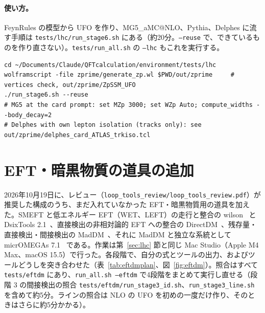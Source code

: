 \documentclass[a4paper,10pt]{ltjsarticle}
\makeatletter
\newcommand{\MGaMC}{MG5\_aMC@NLO}
\makeatother
\begin{document}
\paragraph{使い方。}FeynRules の模型から UFO を作り、\MGaMC{}、Pythia、Delphes に流す手順は \nolinkurl{tests/lhc/run_stage6.sh} にある（約20分。\texttt{--reuse} で、できているものを作り直さない）。\texttt{tests/run\_all.sh} の \texttt{--lhc} もこれを実行する。
\begin{Verbatim}
cd ~/Documents/Claude/QFTcalculation/environment/tests/lhc
wolframscript -file zprime/generate_zp.wl $PWD/out/zprime     # vertices check, out/zprime/ZpSSM_UFO
./run_stage6.sh --reuse
# MG5 at the card prompt: set MZp 3000; set WZp Auto; compute_widths --body_decay=2
# Delphes with own lepton isolation (tracks only): see out/zprime/delphes_card_ATLAS_trkiso.tcl
\end{Verbatim}

\section{EFT・暗黒物質の道具の追加}\label{sec:eftdm}

2026年10月19日に、レビュー（\nolinkurl{loop_tools_review/loop_tools_review.pdf}）が推奨した構成のうち、まだ入れていなかった EFT・暗黒物質用の道具を加えた。SMEFT と低エネルギー EFT（WET、LEFT）の走行と整合の wilson~\cite{wilson} と DsixTools 2.1~\cite{dsixtools,dsixtools2}、直接検出の非相対論的 EFT への整合の DirectDM~\cite{directdm}、残存量・直接検出・間接検出の MadDM~\cite{maddm3,maddm32}、それに MadDM と独立な系統として micrOMEGAs 7.1~\cite{micromegas6} である。作業は第~\ref{sec:lhc} 節と同じ Mac Studio（Apple M4 Max、macOS 15.5）で行った。各段階で、自分の式とツールの出力、およびツールどうしを突き合わせた（表~\ref{tab:eftdmplan}、図~\ref{fig:eftdm}）。照合はすべて \nolinkurl{tests/eftdm} にあり、\texttt{run\_all.sh --eftdm} で4段階をまとめて実行し直せる（段階 3 の間接検出の照合 \nolinkurl{tests/eftdm/run_stage3_id.sh}、\texttt{run\_stage3\_line.sh} を含めて約5分。ラインの照合は NLO の UFO を初めの一度だけ作り、そのときはさらに約5分かかる）。
\end{document}
